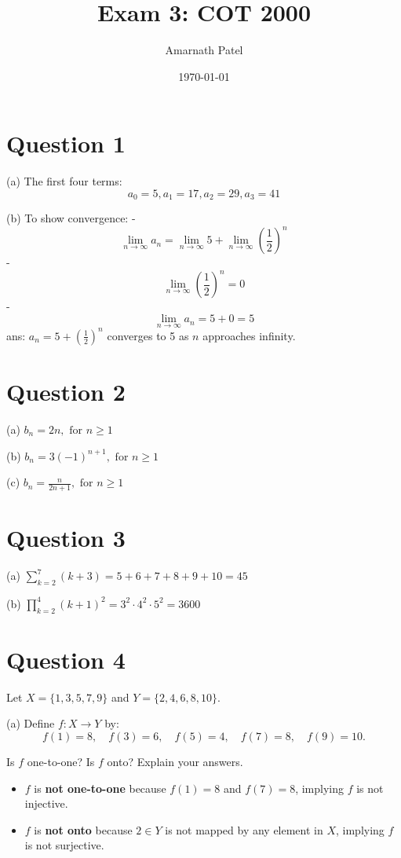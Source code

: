 \documentclass{article}
\author{Amarnath Patel}
\title{Exam 3: COT 2000}
\date{\today}
\begin{document}
\maketitle

\section{Question 1}
(a) The first four terms:
\[a_0 = 5, a_1 = 17, a_2 = 29, a_3 = 41\]

(b) To show convergence:
- \[ \lim_{n \to \infty} a_n = \lim_{n \to \infty} 5 + \lim_{n \to \infty} \left(\frac{1}{2}\right)^n \]
- \[ \lim_{n \to \infty} \left(\frac{1}{2}\right)^n = 0 \]
- \[ \lim_{n \to \infty} a_n = 5 + 0 = 5 \]
ans: \( a_n = 5 + \left(\frac{1}{2}\right)^n \) converges to 5 as \( n \) approaches infinity.

\section{Question 2}
(a) $b_n = 2n, \text{ for } n \geq 1$

(b) $b_n = 3(-1)^{n+1}, \text{ for } n \geq 1$

(c) $b_n = \frac{n}{2n+1}, \text{ for } n \geq 1$

\section{Question 3}
(a) $\sum_{k=2}^7 (k+3) = 5 + 6 + 7 + 8 + 9 + 10 = 45$

(b) $\prod_{k=2}^4 (k+1)^2 = 3^2 \cdot 4^2 \cdot 5^2 = 3600$

\section{Question 4}
Let \( X = \{1, 3, 5, 7, 9\} \) and \( Y = \{2, 4, 6, 8, 10\} \).

(a) Define \( f : X \to Y \) by:
\[
f(1) = 8, \quad
f(3) = 6, \quad
f(5) = 4, \quad
f(7) = 8, \quad
f(9) = 10.
\]

Is \( f \) one-to-one? Is \( f \) onto? Explain your answers.

\begin{itemize}
    \item \( f \) is \textbf{not one-to-one} because \( f(1) = 8 \) and \( f(7) = 8 \), implying \( f \) is not injective.
    \item \( f \) is \textbf{not onto} because \( 2 \in Y \) is not mapped by any element in \( X \), implying \( f \) is not surjective.
\end{itemize}
\end{document}
